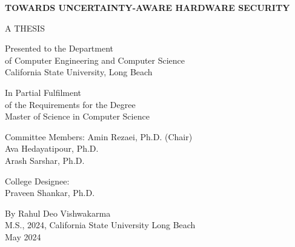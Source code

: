 \begin{titlepage}
    \doublespacing
    \begin{center}

       \uppercase{\textbf{Towards Uncertainty-Aware Hardware Security}}
       
        \vspace{1.5cm}
        A THESIS
  
        Presented to the Department\\ of Computer Engineering and Computer Science\\
        California State University, Long Beach

        \vspace{1.5cm}

        In Partial Fulfilment \\ of the Requirements for the Degree \\
        Master of Science in Computer Science

        
        \vspace{1.5cm}
        Committee Members:
        \singlespacing
        Amin Rezaei, Ph.D. (Chair)
        \\Ava Hedayatipour, Ph.D.
        \\ Arash Sarshar, Ph.D.
       

        \vspace{1.5cm}
        \doublespacing
        College Designee:
        \\Praveen Shankar, Ph.D.

        \vfill
        By Rahul Deo Vishwakarma
        \\M.S., 2024, California State University Long Beach
        \\May 2024
    \end{center}
    
\end{titlepage}